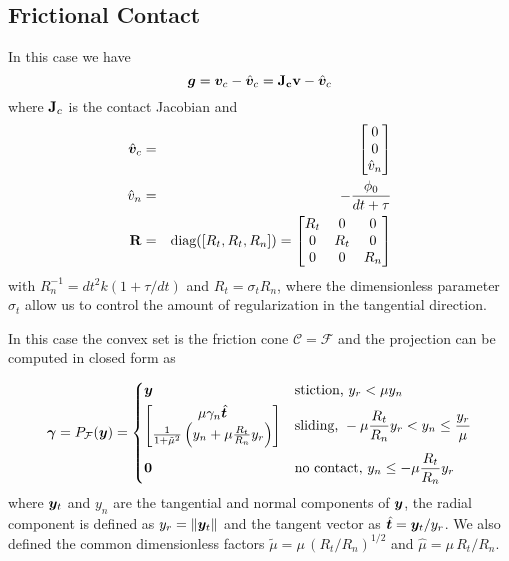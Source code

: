 \subsection{Frictional Contact}
In this case we have
\begin{equation}
	{\bm{g}} = {\bm{v}}_c - \hat{{\bm{v}}}_c = {\mathbf{J_c}}{\mathbf{v}} - \hat{{\bm{v}}}_c
\end{equation}
where ${\mathbf{J}}_c$ is the contact Jacobian and 
\begin{eqnarray}
	\hat{{\bm{v}}}_c &=&
	\begin{bmatrix}
		0\\
		0\\
		\hat{v}_n \end{bmatrix}\nonumber\\
	\hat{v}_n &=& -\frac{\phi_0}{dt+\tau}\nonumber\\
	{\mathbf{R}} &=& \text{diag}([R_t, R_t, R_n]) = 
	\begin{bmatrix}
		R_t &   0 & 0\\
		  0 & R_t & 0\\
		  0 &   0 & R_n
	\end{bmatrix}
\end{eqnarray}
with $R_n^{-1} = dt^2k(1+\tau/dt)$ and $R_t=\sigma_t R_n$, where the
dimensionless parameter $\sigma_t$ allow us to control the amount of
regularization in the tangential direction.

In this case the convex set is the friction cone $\mathcal{C} = \mathcal{F}$ and
the projection can be computed in closed form as

\begin{equation}
	\bgamma = P_\mathcal{F}(\vf{y}) = 
\begin{dcases}
	\vf{y} 
	& \text{stiction, } y_r < \mu y_n\\
	\begin{bmatrix}
		\mu\gamma_n\hat{\vf{t}}\\
		\frac{1}{1+\tilde\mu^2}\left(y_n +
	\mu\frac{R_t}{R_n}y_r\right)
	\end{bmatrix}
	& \text{sliding, } -\mu \frac{R_t}{R_n} y_r < y_n \leq \frac{y_r}{\mu}\\
    \vf{0} & \text{no contact, } y_n \leq -\mu \frac{R_t}{R_n} y_r
\end{dcases}	  
	\label{eq:contact_projection}
\end{equation}
where ${\bm{y}}_t$ and $y_n$ are the tangential and normal components of ${\bm{y}}$,
the radial component is defined as $y_r=\Vert{\bm{y}}_t\Vert$ and the tangent
vector as $\hat{{\bm{t}}}={\bm{y}}_t/y_r$. We also defined the common dimensionless
factors $\tilde\mu=\mu\,(R_t/R_n)^{1/2}$ and $\hat\mu=\mu\,R_t/R_n$.


